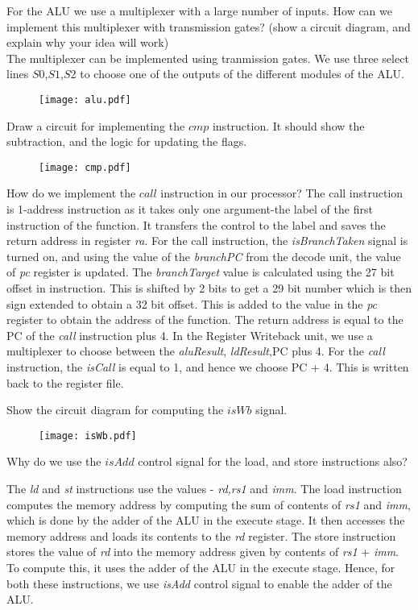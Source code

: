 \begin{ExerciseList}
\Exercise[difficulty=1]
For the ALU we use a multiplexer with a large number of inputs.
How can we implement this multiplexer
with transmission gates? (show a circuit diagram, and explain why your idea will
work) 
\Answer
\hspace{1mm} \\
The multiplexer can be implemented using tranmission gates. We use three select lines $S0$,$S1$,$S2$ to choose one of the outputs of the different modules of the ALU.
\begin{figure}[H]
  \centering
  \texttt{[image: alu.pdf]}
\end{figure}
\Exercise
Draw a circuit for implementing the $cmp$ instruction. It should show the subtraction, and the logic
for updating the flags.
\begin{figure}[H]
  \centering
  \texttt{[image: cmp.pdf]}
\end{figure}
\Exercise
How do we implement the $call$ instruction in our processor?
\Answer
The call instruction is 1-address instruction as it takes only one argument-the label of the first instruction of the function. It transfers the control to the label and saves the return address in register \textit{ra}.
For the call instruction, the \textit{isBranchTaken} signal is turned on, and using the value of the \textit{branchPC} from the decode unit, the value of \textit{pc} register is updated.
The \textit{branchTarget} value is calculated using the 27 bit offset in instruction. This is shifted by 2 bits to get a 29 bit number which is then sign extended to obtain a 32 bit offset. This is added to the value in the \textit{pc} register to obtain the address of the function.
The return address is equal to the PC of the \textit{call} instruction plus 4. In the Register Writeback unit, we use a multiplexer to choose between the  \textit{aluResult}, \textit{ldResult},PC plus 4. For the \textit{call} instruction,
the \textit{isCall} is equal to 1, and hence we choose PC + 4. This is written back to the register file.

\Exercise
Show the circuit diagram for computing the $isWb$ signal.
\begin{figure}[H]
  \centering
  \texttt{[image: isWb.pdf]}
\end{figure}
\Exercise
Why do we use the $isAdd$ control signal for the load, and store instructions also?

\Answer
The \textit{ld} and \textit{st} instructions use the values - \textit{rd,rs1} and \textit{imm}. The load instruction computes the memory address by computing the sum of contents of \textit{rs1} and \textit{imm}, which is done by the adder of the ALU in the execute stage. It then accesses the memory address and loads its contents to the \textit{rd} register.
The store instruction stores the value of \textit{rd} into the memory address given by contents of \textit{rs1} + \textit{imm}. To compute this, it uses the adder of the ALU in the execute stage.
Hence, for both these instructions, we use \textit{isAdd} control signal to enable the adder of the ALU.
\end{ExerciseList}

